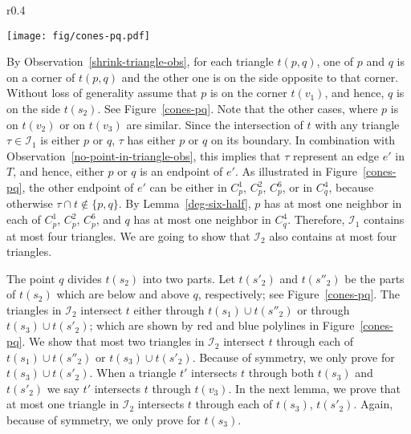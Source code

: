 \documentclass[11pt,a4paper]{article}
\newcommand{\cone}[2]{C^{#1}_{#2}}
\newcommand{\tra}[2]{{#1}({#2})}
\begin{document}
\begin{wrapfigure}{r}{0.4\textwidth}
\vspace{-20pt}
 \begin{center}
\texttt{[image: fig/cones-pq.pdf]}
  \end{center}
\vspace{-15pt}
  \caption{Illustration of the triangles in $\mathcal{I}_1$.}
\label{cones-pq}
\vspace{-8pt}
\end{wrapfigure}
By Observation~\ref{shrink-triangle-obs}, for each triangle $t(p,q)$, one of $p$ and $q$ is on a corner of $t(p,q)$ and the other one is on the side opposite to that corner. Without loss of generality assume that $p$ is on the corner $t(v_1)$, and hence, $q$ is on the side $t(s_2)$. See Figure~\ref{cones-pq}. Note that the other cases, where $p$ is on $t(v_2)$ or on $t(v_3)$ are similar.
Since the intersection of $t$ with any triangle $\tau\in\mathcal{I}_1$ is either $p$ or $q$, $\tau$ has either $p$ or $q$ on its boundary. In combination with Observation~\ref{no-point-in-triangle-obs}, this implies that $\tau$ represent an edge $e'$ in $T$, and hence, either $p$ or $q$ is an endpoint of $e'$. As illustrated in Figure~\ref{cones-pq}, the other endpoint of $e'$ can be either in $\cone{1}{p}$, $\cone{2}{p}$, $\cone{6}{p}$, or in $\cone{4}{q}$, because otherwise $\tau\cap t\notin \{p,q\}$. By Lemma~\ref{deg-six-half}, $p$ has at most one neighbor in each of $\cone{1}{p}$, $\cone{2}{p}$, $\cone{6}{p}$, and $q$ has at most one neighbor in $\cone{4}{q}$. Therefore, $\mathcal{I}_1$ contains at most four triangles. We are going to show that $\mathcal{I}_2$ also contains at most four triangles. 

The point $q$ divides $t(s_2)$ into two parts. Let $\tra{t}{s'_2}$ and $\tra{t}{s''_2}$ be the parts of $\tra{t}{s_2}$ which are below and above $q$, respectively; see Figure~\ref{cones-pq}. The triangles in $\mathcal{I}_2$ intersect $t$ either through $t(s_1)\cup t(s''_2)$ or through $t(s_3)\cup t(s'_2)$; which are shown by red and blue polylines in Figure~\ref{cones-pq}. We show that most two triangles in $\mathcal{I}_2$ intersect $t$ through each of $t(s_1)\cup t(s''_2)$ or $t(s_3)\cup t(s'_2)$. Because of symmetry, we only prove for $t(s_3)\cup t(s'_2)$. When a triangle $t'$ intersects $t$ through both $t(s_3)$ and $t(s'_2)$ we say $t'$ intersects $t$ through $t(v_3)$. In the next lemma, we prove that at most one triangle in $\mathcal{I}_2$ intersects $t$ through each of $\tra{t}{s_3}$, $\tra{t}{s'_2}$. Again, because of symmetry, we only prove for $\tra{t}{s_3}$. 
\end{document}
